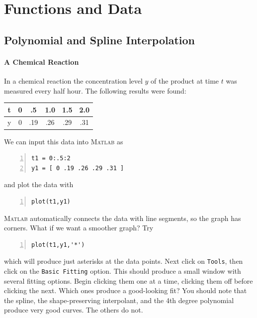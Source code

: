 \part{Functions and Data}


\chapter{Polynomial and Spline Interpolation}


\subsection*{A Chemical Reaction}

In a chemical reaction the concentration level $y$ of
the product at time $t$ was measured every half hour.
The following results were found:\\
\begin{tabular}{c|ccccc}
t & 0 & .5 & 1.0 & 1.5 & 2.0 \\ \hline
y & 0 & .19 & .26 & .29 & .31
\end{tabular}

We can input this data into \textsc{Matlab} as
\begin{lstlisting}[frame=none,numbers=left]
t1 = 0:.5:2
y1 = [ 0 .19 .26 .29 .31 ]
\end{lstlisting}
and plot the data with
\begin{lstlisting}[frame=none,numbers=left]
plot(t1,y1)
\end{lstlisting}
\textsc{Matlab} automatically connects the data with line segments, so the graph has corners.
%
What if we want a smoother graph? Try
\begin{lstlisting}[frame=none,numbers=left]
plot(t1,y1,'*')
\end{lstlisting}
which will produce just asterisks at the data points.  Next click on
\verb&Tools&, then click on the \verb&Basic Fitting& option.  This
should produce a small window with several fitting options.  Begin
clicking them one at a time, clicking them off before clicking the
next. Which ones produce a good-looking fit?  You should note that the
spline, the shape-preserving interpolant, and the 4th degree polynomial
produce very good curves. The others do not.  


